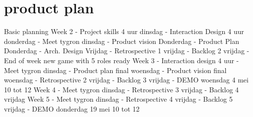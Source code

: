 \section{product plan}
\label{product plan}


Basic planning \newline
Week 2 \newline
-          Project skills 4 uur dinsdag \newline 
-          Interaction Design 4 uur donderdag \newline
\newline
-          Meet tygron dinsdag \newline
-          Product vision Donderdag\newline
-          Product Plan Donderdag\newline
-          Arch. Design Vrijdag\newline
-          Retrospective 1 vrijdag\newline
-          Backlog 2 vrijdag\newline
\newline
-          End of week new game with 5 roles ready\newline
\newline
Week 3\newline
-          Interaction design 4 uur\newline
\newline
-          Meet tygron dinsdag\newline
-          Product plan final woensdag\newline
-          Product vision final woensdag\newline
-          Retrospective 2 vrijdag\newline
-          Backlog 3 vrijdag\newline
\newline
-          DEMO woensdag 4 mei 10 tot 12\newline
Week 4\newline
-          Meet tygron dinsdag\newline
-          Retrospective 3 vrijdag\newline
-          Backlog 4 vrijdag\newline
\newline
Week 5\newline
-          Meet tygron dinsdag\newline
-          Retrospective 4 vrijdag\newline
-          Backlog 5 vrijdag\newline
\newline
-          DEMO donderdag 19 mei 10 tot 12\newline
\newline


